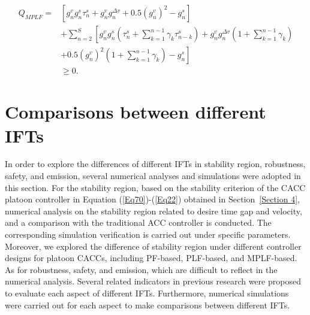 \documentclass[journal]{IEEEtran}
\begin{document}
\begin{equation}
  \begin{aligned}
    Q_{MPLF}= & \left[ g_{n}^{v} g_{n}^{s} \tau_{n}^{s} \!+\!g_{n}^{v} g_{n}^{\Delta v}+0.5\left(g_{n}^{v}\right)^{2}\!-\!g_{n}^{s} \right]                                                                                       \\
              & +\sum_{n=2}^{S} \left[g_{n}^{v} g_{n}^{s}\left(\tau_{n}^{s}\!+\!\sum_{k=1}^{n\!-\!1} \gamma_{k} \tau_{n\!-\!k}^{s}\right)\!+\!g_{n}^{v} g_{n}^{\Delta v}\left(1\!+\!\sum_{k=1}^{n\!-\!1} \gamma_{k}\right)\right. \\
              & +\left.0.5\left(g_{n}^{v}\right)^{2}\left(1\!+\!\sum_{k=1}^{n\!-\!1} \gamma_{k}\right)\!-\!g_{n}^{s} \right]                                                                                                      \\
              & \geq 0.
  \end{aligned}
  \label{Eq73}
\end{equation}


\section{Comparisons between different IFTs}
\label{Section 5}
In order to explore the differences of different IFTs in stability region, robustness, safety, and emission, several numerical analyses and simulations were adopted in this section. For the stability region, based on the stability criterion of the CACC platoon controller in Equation (\ref{Eq70})-(\ref{Eq22}) obtained in Section~\ref{Section 4}, numerical analysis on the stability region related to desire time gap and velocity, and a comparison with the traditional ACC controller is conducted. The corresponding simulation verification is carried out under specific parameters. Moreover, we explored the difference of stability region under different controller designs for platoon CACCs, including PF-based, PLF-based, and MPLF-based. As for robustness, safety, and emission, which are difficult to reflect in the numerical analysis. Several related indicators in previous research were proposed to evaluate each aspect of different IFTs. Furthermore, numerical simulations were carried out for each aspect to make comparisons between different IFTs.
\end{document}
